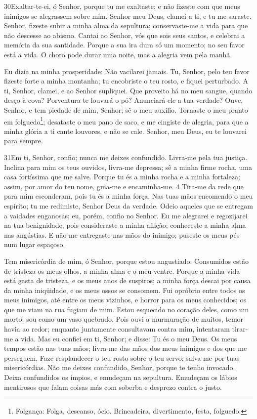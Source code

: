 \bigskip

\lettrine{30}{}Exaltar-te-ei, ó Senhor, porque tu me exaltaste;
e não fizeste com que meus inimigos se alegrassem sobre mim.
Senhor meu Deus, clamei a ti, e tu me saraste. Senhor,
fizeste subir a minha alma da sepultura; conservaste-me a vida para
que não descesse ao abismo. Cantai ao Senhor, vós que sois seus
santos, e celebrai a memória da sua santidade. Porque a sua ira
dura só um momento; no seu favor está a vida. O choro pode durar uma
noite, mas a alegria vem pela manhã.

Eu dizia na minha prosperidade: Não vacilarei jamais. Tu,
Senhor, pelo teu favor fizeste forte a minha montanha; tu encobriste
o teu rosto, e fiquei perturbado. A ti, Senhor, clamei, e ao
Senhor supliquei. Que proveito há no meu sangue, quando desço à
cova? Porventura te louvará o pó? Anunciará ele a tua verdade?
Ouve, Senhor, e tem piedade de mim, Senhor; sê o meu auxílio.
Tornaste o meu pranto em folguedo\footnote{Folgança: Folga,
descanso, ócio. Brincadeira, divertimento, festa, folguedo.};
desataste o meu pano de saco, e me cingiste de alegria, para
que a minha glória a ti cante louvores, e não se cale. Senhor, meu
Deus, eu te louvarei para sempre.

\bigskip

\lettrine{31}{}Em ti, Senhor, confio; nunca me deixes
confundido. Livra-me pela tua justiça. Inclina para mim os teus
ouvidos, livra-me depressa; sê a minha firme rocha, uma casa
fortíssima que me salve. Porque tu és a minha rocha e a minha
fortaleza; assim, por amor do teu nome, guia-me e encaminha-me. 4
Tira-me da rede que para mim esconderam, pois tu és a minha força.
Nas tuas mãos encomendo o meu espírito; tu me redimiste, Senhor
Deus da verdade. Odeio aqueles que se entregam a vaidades
enganosas; eu, porém, confio no Senhor. Eu me alegrarei e
regozijarei na tua benignidade, pois consideraste a minha aflição;
conheceste a minha alma nas angústias. E não me entregaste nas
mãos do inimigo; puseste os meus pés num lugar espaçoso.

Tem misericórdia de mim, ó Senhor, porque estou angustiado.
Consumidos estão de tristeza os meus olhos, a minha alma e o meu
ventre. Porque a minha vida está gasta de tristeza, e os meus
anos de suspiros; a minha força descai por causa da minha
iniqüidade, e os meus ossos se consomem. Fui opróbrio entre
todos os meus inimigos, até entre os meus vizinhos, e horror para os
meus conhecidos; os que me viam na rua fugiam de mim. Estou
esquecido no coração deles, como um morto; sou como um vaso
quebrado. Pois ouvi a murmuração de muitos, temor havia ao
redor; enquanto juntamente consultavam contra mim, intentaram
tirar-me a vida. Mas eu confiei em ti, Senhor; e disse: Tu és
o meu Deus. Os meus tempos estão nas tuas mãos; livra-me das
mãos dos meus inimigos e dos que me perseguem. Faze
resplandecer o teu rosto sobre o teu servo; salva-me por tuas
misericórdias. Não me deixes confundido, Senhor, porque te
tenho invocado. Deixa confundidos os ímpios, e emudeçam na
sepultura. Emudeçam os lábios mentirosos que falam coisas más
com soberba e desprezo contra o justo.

